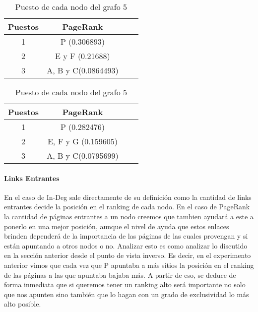 \begin{table}[H]
\centering
\begin{minipage}{0.48\textwidth}
\centering

\begin{tabular}{| c | c | c | c |}
  \hline
  \rowcolor{LightCyan}
  Puestos & PageRank\\ \hline \hline
  1 & P (0.306893)\\ \hline
  2 & E y F (0.21688)\\ \hline
  3 & A, B y C(0.0864493)\\ \hline
\end{tabular}
  \caption{\footnotesize{Puesto de cada nodo del grafo 4}}
  \label{tab:Rankings5}

\end{minipage}
\hspace{0.02\textwidth}
\begin{minipage}{0.48\textwidth}
  \centering

\begin{tabular}{| c | c | c | c |}
  \hline
  \rowcolor{LightCyan}
  Puestos & PageRank\\ \hline \hline
  1 & P (0.282476)\\ \hline
  2 & E, F y G (0.159605)\\ \hline
  3 & A, B y C(0.0795699)\\ \hline
\end{tabular}
  \caption{\footnotesize{Puesto de cada nodo del grafo 5}}
  \label{tab:Rankings6}

\end{minipage}
\end{table}


\paragraph{Links Entrantes}

En el caso de In-Deg sale directamente de su definición como la cantidad de links entrantes decide la posición en el ranking de cada nodo. En el caso de PageRank la cantidad de páginas entrantes a un nodo creemos que tambien ayudará a este a ponerlo en una mejor posición, aunque el nivel de ayuda que estos enlaces brinden dependerá de la importancia de las páginas de las cuales provengan y si están apuntando a otros nodos o no. Analizar esto es como analizar lo discutido en la sección anterior desde el punto de vista inverso. Es decir, en el experimento anterior vimos que cada vez que P apuntaba a más sitios la posición en el ranking de las páginas a las que apuntaba bajaba más. A partir de eso, se deduce de forma inmediata que si queremos tener un ranking alto será importante no solo que nos apunten sino también que lo hagan con un grado de exclusividad lo más alto posible.

